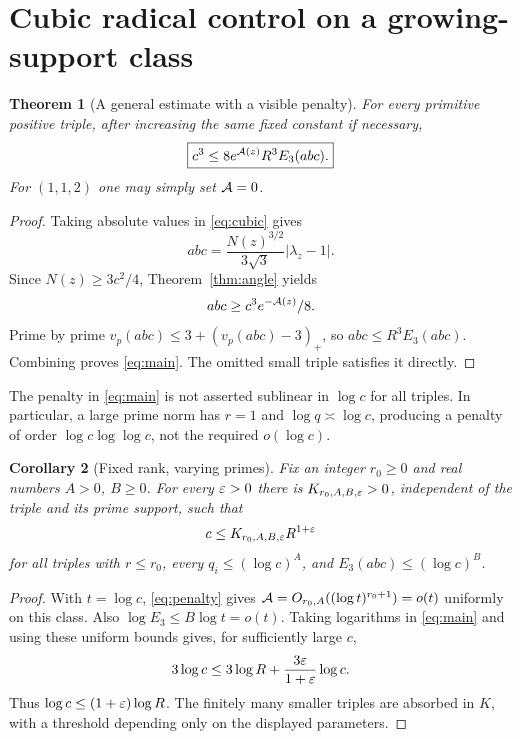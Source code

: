 \documentclass[11pt]{amsart}
\newtheorem{theorem}{Theorem}[section]
\newtheorem{corollary}[theorem]{Corollary}
\theoremstyle{definition}\newtheorem{definition}[theorem]{Definition}
\theoremstyle{remark}\newtheorem{remark}[theorem]{Remark}
\begin{document}
\section{Cubic radical control on a growing-support class}
\begin{theorem}[A general estimate with a visible penalty]\label{thm:general}
For every primitive positive triple, after increasing the same fixed constant if necessary,
\begin{equation}\label{eq:main}
 \boxed{c^3\le8e^{\mathcal A(z)}R^3 E_3(abc).}
\end{equation}
For $(1,1,2)$ one may simply set $\mathcal A=0$.
\end{theorem}
\begin{proof}
Taking absolute values in \eqref{eq:cubic} gives
\[
 abc=\frac{N(z)^{3/2}}{3\sqrt3}|\lambda_z-1|.
\]
Since $N(z)\ge3c^2/4$, Theorem~\ref{thm:angle} yields
\[
 abc\ge c^3 e^{-\mathcal A(z)}/8.
\]
Prime by prime $v_p(abc)\le3+(v_p(abc)-3)_+$, so $abc\le R^3E_3(abc)$. Combining proves \eqref{eq:main}. The omitted small triple satisfies it directly.
\end{proof}

The penalty in \eqref{eq:main} is not asserted sublinear in $\log c$ for all triples. In particular, a large prime norm has $r=1$ and $\log q\asymp\log c$, producing a penalty of order $\log c\log\log c$, not the required $o(\log c)$.

\begin{corollary}[Fixed rank, varying primes]\label{cor:fixedrank}
Fix an integer $r_0\ge0$ and real numbers $A>0$, $B\ge0$. For every $\varepsilon>0$ there is $K_{r_0,A,B,\varepsilon}>0$, independent of the triple and its prime support, such that
\[
 c\le K_{r_0,A,B,\varepsilon} R^{1+\varepsilon}
\]
for all triples with $r\le r_0$, every $q_i\le(\log c)^A$, and $E_3(abc)\le(\log c)^B$.
\end{corollary}
\begin{proof}
With $t=\log c$, \eqref{eq:penalty} gives
$\mathcal A=O_{r_0,A}((\log t)^{r_0+1})=o(t)$ uniformly on this class. Also $\log E_3\le B\log t=o(t)$. Taking logarithms in \eqref{eq:main} and using these uniform bounds gives, for sufficiently large $c$,
\[
 3\log c\le3\log R+\frac{3\varepsilon}{1+\varepsilon}\log c.
\]
Thus $\log c\le(1+\varepsilon)\log R$. The finitely many smaller triples are absorbed in $K$, with a threshold depending only on the displayed parameters.
\end{proof}
\end{document}
